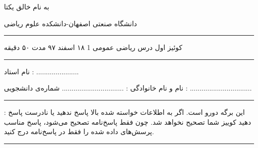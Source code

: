 \documentclass{article}
\begin{document}
{\bf 
\begin{center}     
{ \huge به نام خالق یکتا}

{ \Large دانشگاه صنعتی اصفهان-دانشکده علوم ریاضی}

\vspace{0.5cm}
\hrule height .5mm
\vspace{0.5cm}

{\large         کوئیز اول درس ریاضی عمومی 1     
    \hspace{0.7cm} 
    ۱۸ اسفند ۹۷ 
    \hspace{0.7cm} مدت ۵۰ دقیقه}

\vspace{0.5cm}
\hrule height .5mm
\vspace{0.5cm}

{\large نام استاد : ......................}
\vspace{0.5cm}

{\large نام و نام خانوادگی : ................................}
{\large شماره‌ی  دانشجویی   : ................................}
\end{center}
\vspace{5mm}

\hrule height .5mm
\vskip 2mm

 : 
این برگه دورو است. اگر به اطلاعات خواسته شده بالا پاسخ ندهید یا نادرست پاسخ دهید کوییز شما تصحیح
 نخواهد شد. چون فقط پاسخ‌نامه تصحیح می‌شود، پاسخ مناسب پرسش‌های داده شده را فقط در پاسخ‌نامه درج کنید.

\vskip 2mm
\hrule height .5mm
\vspace{0.3cm}
}
\end{document}
